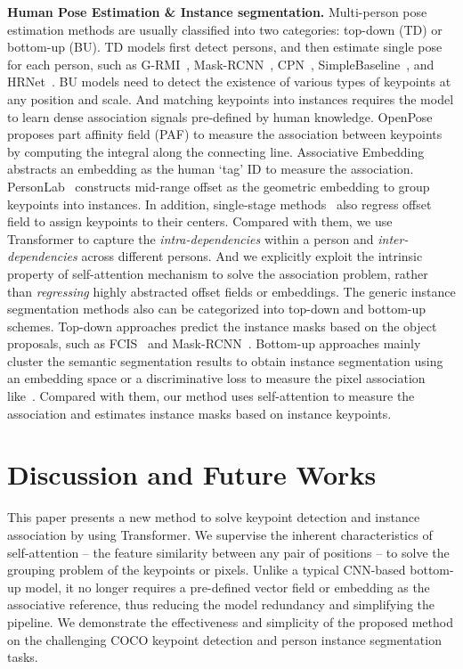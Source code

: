 \documentclass{article} \usepackage{iclr_conference,times}
\begin{document}
{\bf Human Pose Estimation \& Instance segmentation.} 
Multi-person pose estimation methods are usually classified into two categories: top-down (TD) or bottom-up (BU). TD models first detect persons, and then estimate single pose for each person, such as G-RMI~\citep{grmi:papandreou2017towards}, Mask-RCNN~\citep{mask:he2017mask}, CPN~\citep{cpn:chen2018cascaded}, SimpleBaseline~\citep{xiao2018simple}, and HRNet~\citep{hrnet:sun2019deep}. 
BU models need to detect the existence of various types of keypoints at any position and scale. And matching keypoints into instances requires the model to learn dense association signals pre-defined by human knowledge. OpenPose~\citep{openpose:cao2017realtime} proposes part affinity field (PAF) to measure the association between keypoints by computing the integral along the connecting line. Associative Embedding~\citep{ae:newell2016associative} abstracts an embedding as the human `tag' ID to measure the association. PersonLab~\citep{personlab:papandreou2018personlab} constructs mid-range offset as the geometric embedding to group keypoints into instances. In addition, single-stage methods~\citep{centernet:zhou2019objects, spm:nie2019single} also 
regress offset field to assign keypoints to their centers. Compared with them, we use Transformer to capture the \textit{intra-dependencies} within a person and\textit{ inter-dependencies} across different persons. And we explicitly exploit the intrinsic property of self-attention mechanism to solve the association problem, rather than \textit{regressing} highly abstracted offset fields or embeddings. The generic instance segmentation methods also can be categorized into top-down and bottom-up schemes. Top-down approaches predict the instance masks based on the object proposals, such as FCIS~\citep{fcis:li2017fully} and Mask-RCNN~\citep{mask:he2017mask}. Bottom-up approaches mainly cluster the semantic segmentation results to obtain instance segmentation using an embedding space or a discriminative loss to measure the pixel association like~\citep{ae:newell2016associative, de2017semantic, fathi2017semantic}. Compared with them, our method uses self-attention to measure the association and estimates instance masks based on instance keypoints.


\section{Discussion and Future Works}

This paper presents a new method to solve keypoint detection and instance association by using Transformer. 
We supervise the inherent characteristics of self-attention -- the feature similarity between any pair of positions -- to solve the grouping problem of the keypoints or pixels. 
Unlike a typical CNN-based bottom-up model, it no longer requires a pre-defined vector field or embedding as the associative reference, thus reducing the model redundancy and simplifying the pipeline. We demonstrate the effectiveness and simplicity of the proposed method on the challenging COCO keypoint detection and person instance segmentation tasks. 
\end{document}
